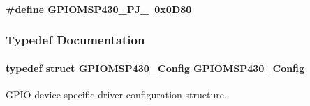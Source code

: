 \paragraph[{G\+P\+I\+O\+M\+S\+P430\+\_\+\+P\+J\+\_\+7}]{\setlength{\rightskip}{0pt plus 5cm}\#define G\+P\+I\+O\+M\+S\+P430\+\_\+\+P\+J\+\_~0x0\+D80}\label{_g_p_i_o_m_s_p430_8h_aba5f8e331f0492122bd90a6661551c6f}


\subsubsection{Typedef Documentation}
\paragraph[{G\+P\+I\+O\+M\+S\+P430\+\_\+\+Config}]{\setlength{\rightskip}{0pt plus 5cm}typedef struct {\bf G\+P\+I\+O\+M\+S\+P430\+\_\+\+Config}  {\bf G\+P\+I\+O\+M\+S\+P430\+\_\+\+Config}}\label{_g_p_i_o_m_s_p430_8h_a75e3910032d3d00d96abcd64788c2d07}


G\+P\+I\+O device specific driver configuration structure. 

